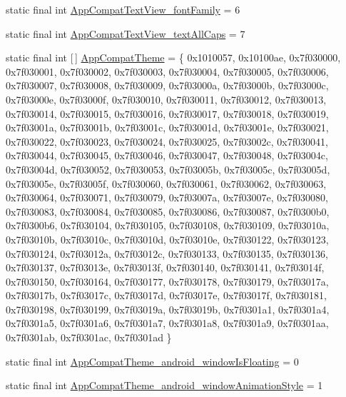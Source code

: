 \begin{DoxyCompactItemize}
\item 
static final int \mbox{\hyperlink{classcom_1_1synnapps_1_1carouselview_1_1_r_1_1styleable_a6f86b5793239c7db60c4f5dbe64fa015}{App\+Compat\+Text\+View\+\_\+font\+Family}} = 6
\item 
static final int \mbox{\hyperlink{classcom_1_1synnapps_1_1carouselview_1_1_r_1_1styleable_a0391a1898a3325fbb327bc20e6528048}{App\+Compat\+Text\+View\+\_\+text\+All\+Caps}} = 7
\item 
static final int \mbox{[}$\,$\mbox{]} \mbox{\hyperlink{classcom_1_1synnapps_1_1carouselview_1_1_r_1_1styleable_a2d57b9e0a5784b922e3c055dec998728}{App\+Compat\+Theme}} = \{ 0x1010057, 0x10100ae, 0x7f030000, 0x7f030001, 0x7f030002, 0x7f030003, 0x7f030004, 0x7f030005, 0x7f030006, 0x7f030007, 0x7f030008, 0x7f030009, 0x7f03000a, 0x7f03000b, 0x7f03000c, 0x7f03000e, 0x7f03000f, 0x7f030010, 0x7f030011, 0x7f030012, 0x7f030013, 0x7f030014, 0x7f030015, 0x7f030016, 0x7f030017, 0x7f030018, 0x7f030019, 0x7f03001a, 0x7f03001b, 0x7f03001c, 0x7f03001d, 0x7f03001e, 0x7f030021, 0x7f030022, 0x7f030023, 0x7f030024, 0x7f030025, 0x7f03002c, 0x7f030041, 0x7f030044, 0x7f030045, 0x7f030046, 0x7f030047, 0x7f030048, 0x7f03004c, 0x7f03004d, 0x7f030052, 0x7f030053, 0x7f03005b, 0x7f03005c, 0x7f03005d, 0x7f03005e, 0x7f03005f, 0x7f030060, 0x7f030061, 0x7f030062, 0x7f030063, 0x7f030064, 0x7f030071, 0x7f030079, 0x7f03007a, 0x7f03007e, 0x7f030080, 0x7f030083, 0x7f030084, 0x7f030085, 0x7f030086, 0x7f030087, 0x7f0300b0, 0x7f0300b6, 0x7f030104, 0x7f030105, 0x7f030108, 0x7f030109, 0x7f03010a, 0x7f03010b, 0x7f03010c, 0x7f03010d, 0x7f03010e, 0x7f030122, 0x7f030123, 0x7f030124, 0x7f03012a, 0x7f03012c, 0x7f030133, 0x7f030135, 0x7f030136, 0x7f030137, 0x7f03013e, 0x7f03013f, 0x7f030140, 0x7f030141, 0x7f03014f, 0x7f030150, 0x7f030164, 0x7f030177, 0x7f030178, 0x7f030179, 0x7f03017a, 0x7f03017b, 0x7f03017c, 0x7f03017d, 0x7f03017e, 0x7f03017f, 0x7f030181, 0x7f030198, 0x7f030199, 0x7f03019a, 0x7f03019b, 0x7f0301a1, 0x7f0301a4, 0x7f0301a5, 0x7f0301a6, 0x7f0301a7, 0x7f0301a8, 0x7f0301a9, 0x7f0301aa, 0x7f0301ab, 0x7f0301ac, 0x7f0301ad \}
\item 
static final int \mbox{\hyperlink{classcom_1_1synnapps_1_1carouselview_1_1_r_1_1styleable_ab6a2cbfa42b5308745e617c822d89c1f}{App\+Compat\+Theme\+\_\+android\+\_\+window\+Is\+Floating}} = 0
\item 
static final int \mbox{\hyperlink{classcom_1_1synnapps_1_1carouselview_1_1_r_1_1styleable_acdf5787091d7d643372e1441ae53984a}{App\+Compat\+Theme\+\_\+android\+\_\+window\+Animation\+Style}} = 1
\item 

\end{DoxyCompactItemize}
